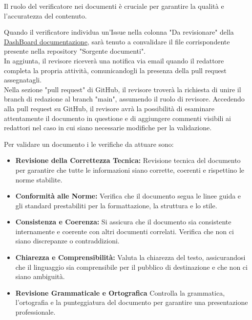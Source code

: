 \documentclass{article}
\begin{document}
    Il ruolo del verificatore nei documenti è cruciale per garantire la qualità e l'accuratezza del contenuto.

Quando il verificatore individua un'Issue nella colonna "Da revisionare" della  \href{https://github.com/orgs/ByteOps-swe/projects/1/views/1}{DashBoard documentazione}, sarà tenuto a convalidare il file corrispondente presente nella repository "Sorgente documenti". \\
In aggiunta, il revisore riceverà una notifica via email quando il redattore completa la propria attività, comunicandogli la presenza della pull request assegnatagli.\\
Nella sezione "pull request" di GitHub, il revisore troverà la richiesta di unire il branch di redazione al branch "main", assumendo il ruolo di revisore. Accedendo alla pull request su GitHub, il revisore avrà la possibilità di esaminare attentamente il documento in questione e di aggiungere commenti visibili ai redattori nel caso in cui siano necessarie modifiche per la validazione.

\vspace{0.3cm}

Per validare un documento i le verifiche da attuare sono:
\begin{itemize}
    \item \textbf{Revisione della Correttezza Tecnica:} Revisione tecnica del documento per garantire che tutte le informazioni siano corrette, coerenti e rispettino le norme stabilite.
     \item \textbf{Conformità alle Norme:} Verifica che il documento segua le linee guida e gli standard prestabiliti per la formattazione, la struttura e lo stile.
      \item \textbf{Consistenza e Coerenza:} Si assicura che il documento sia consistente internamente e coerente con altri documenti correlati. Verifica che non ci siano discrepanze o contraddizioni.
      \item \textbf{Chiarezza e Comprensibilità:} Valuta la chiarezza del testo, assicurandosi che il linguaggio sia comprensibile per il pubblico di destinazione e che non ci siano ambiguità.
      \item \textbf{Revisione Grammaticale e Ortografica} Controlla la grammatica, l'ortografia e la punteggiatura del documento per garantire una presentazione professionale.
\end{itemize}
\end{document}
